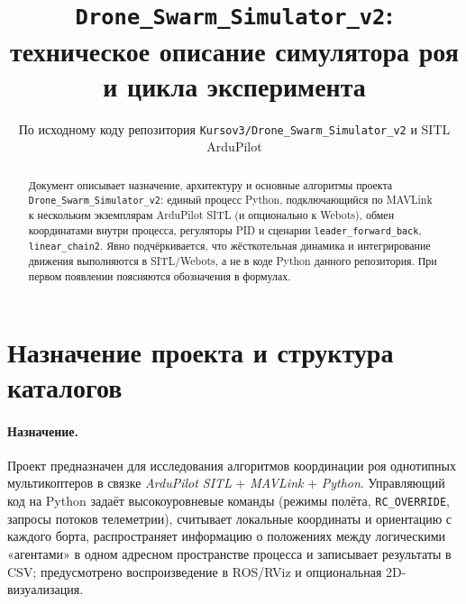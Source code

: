 \documentclass[12pt,a4paper]{article}
\title{\texttt{Drone\_Swarm\_Simulator\_v2}:\\
техническое описание симулятора роя и цикла эксперимента}
\author{По исходному коду репозитория \texttt{Kursov3/Drone\_Swarm\_Simulator\_v2} и SITL ArduPilot}
\date{}
\begin{document}
\maketitle

\begin{abstract}
Документ описывает назначение, архитектуру и основные алгоритмы проекта \texttt{Drone\_Swarm\_Simulator\_v2}: единый процесс Python, подключающийся по MAVLink к нескольким экземплярам ArduPilot SITL (и опционально к Webots), обмен координатами внутри процесса, регуляторы PID и сценарии \texttt{leader\_forward\_back}, \texttt{linear\_chain2}. Явно подчёркивается, что жёсткотельная динамика и интегрирование движения выполняются в SITL/Webots, а не в коде Python данного репозитория. При первом появлении поясняются обозначения в формулах.
\end{abstract}

\tableofcontents
\newpage

\section{Назначение проекта и структура каталогов}

\paragraph{Назначение.}
Проект предназначен для исследования алгоритмов координации роя однотипных мультикоптеров в связке \emph{ArduPilot SITL} + \emph{MAVLink} + \emph{Python}. Управляющий код на Python задаёт высокоуровневые команды (режимы полёта, \texttt{RC\_OVERRIDE}, запросы потоков телеметрии), считывает локальные координаты и ориентацию с каждого борта, распространяет информацию о положениях между логическими «агентами» в одном адресном пространстве процесса и записывает результаты в CSV; предусмотрено воспроизведение в ROS/RViz и опциональная 2D-визуализация.
\end{document}
